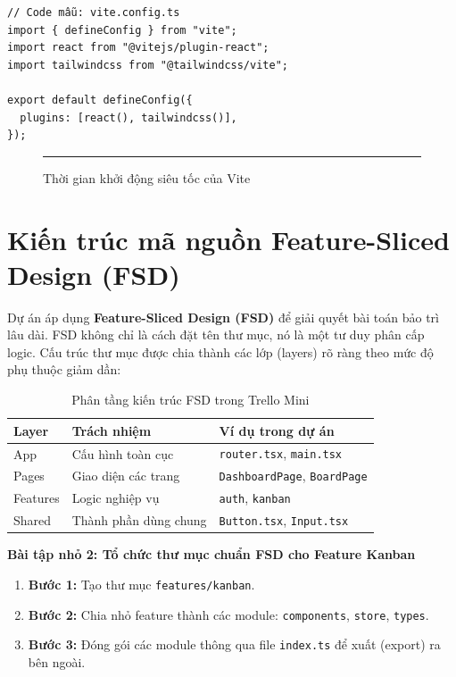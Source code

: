 \begin{Verbatim}
// Code mẫu: vite.config.ts
import { defineConfig } from "vite";
import react from "@vitejs/plugin-react";
import tailwindcss from "@tailwindcss/vite";

export default defineConfig({
  plugins: [react(), tailwindcss()],
});
\end{Verbatim}

\begin{figure}[H]
    \centering
    \rule{0.8\textwidth}{0.3\textwidth}
    \caption{Thời gian khởi động siêu tốc của Vite}
\end{figure}


\section{Kiến trúc mã nguồn Feature-Sliced Design (FSD)}
Dự án áp dụng \textbf{Feature-Sliced Design (FSD)} để giải quyết bài toán bảo trì lâu dài. FSD không chỉ là cách đặt tên thư mục, nó là một tư duy phân cấp logic. Cấu trúc thư mục được chia thành các lớp (layers) rõ ràng theo mức độ phụ thuộc giảm dần:

\begin{table}[H]
\centering
\begin{tabular}{|l|l|l|}
\hline
\textbf{Layer} & \textbf{Trách nhiệm} & \textbf{Ví dụ trong dự án} \\ \hline
App & Cấu hình toàn cục & \texttt{router.tsx}, \texttt{main.tsx} \\ \hline
Pages & Giao diện các trang & \texttt{DashboardPage}, \texttt{BoardPage} \\ \hline
Features & Logic nghiệp vụ & \texttt{auth}, \texttt{kanban} \\ \hline
Shared & Thành phần dùng chung & \texttt{Button.tsx}, \texttt{Input.tsx} \\ \hline
\end{tabular}
\caption{Phân tầng kiến trúc FSD trong Trello Mini}
\end{table}

\textbf{Bài tập nhỏ 2: Tổ chức thư mục chuẩn FSD cho Feature Kanban}
\begin{enumerate}
    \item \textbf{Bước 1:} Tạo thư mục \texttt{features/kanban}.
    \item \textbf{Bước 2:} Chia nhỏ feature thành các module: \texttt{components}, \texttt{store}, \texttt{types}.
    \item \textbf{Bước 3:} Đóng gói các module thông qua file \texttt{index.ts} để xuất (export) ra bên ngoài.
\end{enumerate}

